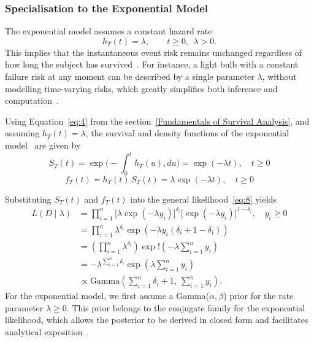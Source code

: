 \subsubsection{Specialisation to the Exponential Model}
The exponential model assumes a constant hazard rate
\begin{equation}
h_T(t)=\lambda,\qquad t\ge 0,\ \ \lambda>0 .
\end{equation}
This implies that the instantaneous event risk remains unchanged regardless of how long the subject has survived~\cite{lawless2011statistical, ibrahim2013bayesian}. For instance, a light bulb with a constant failure risk at any moment can be described by a single parameter $\lambda$, without modelling time-varying risks, which greatly simplifies both inference and computation~\cite{lawless2011statistical}.

Using Equation~\eqref{eq:4} from the section~\ref{Fundamentals of Survival Analysis}, and assuming $h_T(t) = \lambda$, the survival and density functions of the exponential model~\cite{kleinbaum1996survival} are given by
\begin{equation}
    S_T(t) = \exp\Big( -\displaystyle\int_0^t h_T(u), du \Big)=\exp(-\lambda t), \quad t \ge 0
    \label{St_exp}
\end{equation}
\begin{equation}
    f_T(t) = h_T(t)\, S_T(t)=\lambda \exp(-\lambda t), \quad t \ge 0
    \label{ft_exp}
\end{equation}

Substituting $S_T(t)$ and $f_T(t)$ into the general likelihood~\eqref{eq:8} yields~\cite{ibrahim2013bayesian}
\begin{align}
L(D \mid \lambda)
&=\prod_{i=1}^{n}
\big[\lambda \exp(-\lambda y_i)\big]^{\delta_i}
\big[\exp(-\lambda y_i)\big]^{1-\delta_i}, \quad y_i \ge 0 \\
&=
\prod_{i=1}^{n}
\lambda^{\delta_i}
\exp\left(
-\lambda y_i (\delta_i + 1 - \delta_i)
\right) \\
&=
\left(
\prod_{i=1}^{n}
\lambda^{\delta_i}
\right)
\exp!\left(
-\lambda \sum_{i=1}^{n} y_i
\right)\\
&=
-\lambda^{\sum_{i=1}^{n} \delta_i}
\exp\left(
\lambda \sum_{i=1}^{n} y_i
\right)\\
&\propto
\text{Gamma}
\left(
\sum_{i=1}^{n} \delta_i + 1,\ \sum_{i=1}^{n} y_i
\right).
\end{align}
For the exponential model, we first assume a Gamma($\alpha, \beta$) prior for the rate parameter $\lambda \ge 0$. This prior belongs to the conjugate family for the exponential likelihood, which allows the posterior to be derived in closed form and facilitates analytical exposition~\cite{kalbfleisch2002statistical}.

